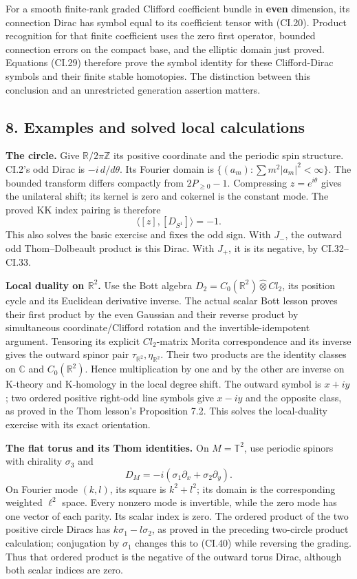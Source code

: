\documentclass[
  11pt,
]{article}
\begin{document}
For a smooth finite-rank graded Clifford coefficient bundle in
\textbf{even} dimension, its connection Dirac has symbol equal to its
coefficient tensor with (CI.20). Product recognition for that finite
coefficient uses the zero first operator, bounded connection errors on
the compact base, and the elliptic domain just proved. Equations (CI.29)
therefore prove the symbol identity for these Clifford-Dirac symbols and
their finite stable homotopies. The distinction between this conclusion
and an unrestricted generation assertion matters.

\subsection{8. Examples and solved local
calculations}\label{examples-and-solved-local-calculations}

\textbf{The circle.} Give \(\mathbb R/2\pi\mathbb Z\) its positive
coordinate and the periodic spin structure. CI.2's odd Dirac is
\(-i\,d/d\theta\). Its Fourier domain is
\(\{(a_m):\sum m^2|a_m|^2<\infty\}\). The bounded transform differs
compactly from \(2P_{\geq0}-1\). Compressing \(z=e^{i\theta}\) gives the
unilateral shift; its kernel is zero and cokernel is the constant mode.
The proved KK index pairing is therefore \[
 \langle[z],[D_{S^1}]\rangle=-1.
 \tag{CI.39}
\] This also solves the basic exercise and fixes the odd sign. With
\(J_-\), the outward odd Thom--Dolbeault product is this Dirac. With
\(J_+\), it is its negative, by CI.32--CI.33.

\textbf{Local duality on \(\mathbb R^2\).} Use the Bott algebra
\(D_2=C_0(\mathbb R^2)\widehat\otimes Cl_2\), its position cycle and its
Euclidean derivative inverse. The actual scalar Bott lesson proves their
first product by the even Gaussian and their reverse product by
simultaneous coordinate/Clifford rotation and the invertible-idempotent
argument. Tensoring its explicit \(Cl_2\)-matrix Morita correspondence
and its inverse gives the outward spinor pair
\(\tau_{\mathbb R^2},\eta_{\mathbb R^2}\). Their two products are the
identity classes on \(\mathbb C\) and \(C_0(\mathbb R^2)\). Hence
multiplication by one and by the other are inverse on K-theory and
K-homology in the local degree shift. The outward symbol is \(x+iy\);
two ordered positive right-odd line symbols give \(x-iy\) and the
opposite class, as proved in the Thom lesson's Proposition 7.2. This
solves the local-duality exercise with its exact orientation.

\textbf{The flat torus and its Thom identities.} On \(M=\mathbb T^2\),
use periodic spinors with chirality \(\sigma_3\) and \[
 D_M=-i(\sigma_1\partial_x+\sigma_2\partial_y).
 \tag{CI.40}
\] On Fourier mode \((k,l)\), its square is \(k^2+l^2\); its domain is
the corresponding weighted \(\ell^2\) space. Every nonzero mode is
invertible, while the zero mode has one vector of each parity. Its
scalar index is zero. The ordered product of the two positive circle
Diracs has \(k\sigma_1-l\sigma_2\), as proved in the preceding
two-circle product calculation; conjugation by \(\sigma_1\) changes this
to (CI.40) while reversing the grading. Thus that ordered product is the
negative of the outward torus Dirac, although both scalar indices are
zero.
\end{document}
